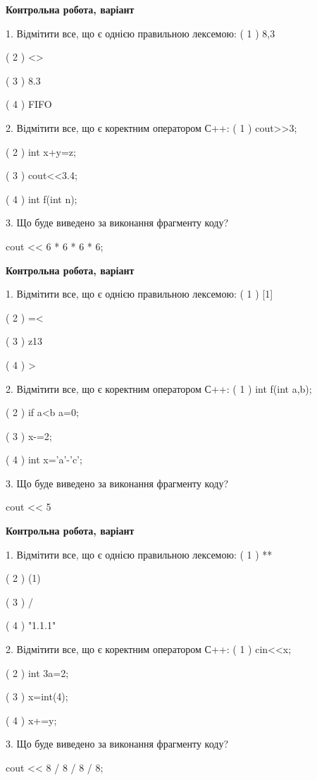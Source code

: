 \documentclass[11pt, ukrainian]{article}
\begin{document}
\begin{large}
\textbf{Контрольна робота, варіант }\par

1. Відмітити все, що є однією правильною лексемою:
( 1 ) 8,3

( 2 ) <>

( 3 ) 8.3

( 4 ) FIFO


2. Відмітити все, що є коректним оператором С++:
( 1 ) cout>>3;

( 2 ) int x+y=z;

( 3 ) cout<<3.4;

( 4 ) int f(int n);


3. Що буде виведено за виконання фрагменту коду?

cout << 6 * 6 * 6 * 6;

\end{large}
\vspace{20mm}
\begin{large}
\textbf{Контрольна робота, варіант }\par

1. Відмітити все, що є однією правильною лексемою:
( 1 ) [1]

( 2 ) =<

( 3 ) z13

( 4 ) >


2. Відмітити все, що є коректним оператором С++:
( 1 ) int f(int a,b);

( 2 ) if a<b a=0;

( 3 ) x-=2;

( 4 ) int x='a'-'c';


3. Що буде виведено за виконання фрагменту коду?

cout << 5 %

\end{large}
\newpage
\begin{large}
\textbf{Контрольна робота, варіант }\par

1. Відмітити все, що є однією правильною лексемою:
( 1 ) **

( 2 ) (1)

( 3 ) /

( 4 ) "1.1.1"


2. Відмітити все, що є коректним оператором С++:
( 1 ) cin<<x;

( 2 ) int 3a=2;

( 3 ) x=int(4);

( 4 ) x+=y;


3. Що буде виведено за виконання фрагменту коду?

cout << 8 / 8 / 8 / 8;

\end{large}
\end{document}
